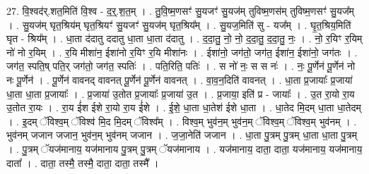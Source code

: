 \documentclass[17pt]{extarticle}
\begin{document}
27. वि॒श्वद॑र्.शत॒मिति॑ वि॒श्व - द॒र्॒.श॒त॒म् । . तु॒वि॒ष्म॒णसꣳ॑ सु॒यजꣳ॑ सु॒यज॑म् तुविष्म॒णस॑म् तुविष्म॒णसꣳ॑ सु॒यज᳚म् । . सु॒यज॑म् घृत॒श्रिय॑म् घृत॒श्रियꣳ॑ सु॒यजꣳ॑ सु॒यज॑म् घृत॒श्रिय᳚म् । . सु॒यज॒मिति॑ सु - यज᳚म् । . घृ॒त॒श्रिय॒मिति॑ घृत - श्रिय᳚म् । . धा॒ता द॑दातु ददातु धा॒ता धा॒ता द॑दातु । . द॒दा॒तु॒ नो॒ नो॒ द॒दा॒तु॒ द॒दा॒तु॒ नः॒ । . नो॒ र॒यिꣳ र॒यिम् नो॑ नो र॒यिम् । . र॒यि मीशा॑न॒ ईशा॑नो र॒यिꣳ र॒यि मीशा॑नः । . ईशा॑नो॒ जग॑तो॒ जग॑त॒ ईशा॑न॒ ईशा॑नो॒ जग॑तः । . जग॑त॒ स्पति॒ष् पति॒र् जग॑तो॒ जग॑त॒ स्पतिः॑ । . पति॒रिति॒ पतिः॑ । . स नो॑ नः॒ स स नः॑ । . नः॒ पू॒र्णेन॑ पू॒र्णेन॑ नो नः पू॒र्णेन॑ । . पू॒र्णेन॑ वावनद् वावनत् पू॒र्णेन॑ पू॒र्णेन॑ वावनत् । . वा॒व॒न॒दिति॑ वावनत् । . धा॒ता प्र॒जायाः᳚ प्र॒जाया॑ धा॒ता धा॒ता प्र॒जायाः᳚ । . प्र॒जाया॑ उ॒तोत प्र॒जायाः᳚ प्र॒जाया॑ उ॒त । . प्र॒जाया॒ इति॑ प्र - जायाः᳚ । . उ॒त रा॒यो रा॒य उ॒तोत रा॒यः । . रा॒य ई॑श ईशे रा॒यो रा॒य ई॑शे । . ई॒शे॒ धा॒ता धा॒तेश॑ ईशे धा॒ता । . धा॒तेद मि॒दम् धा॒ता धा॒तेदम् । . इ॒दम् ॅविश्व॒म् ॅविश्व॑ मि॒द मि॒दम् ॅविश्व᳚म् । . विश्व॒म् भुव॑न॒म् भुव॑न॒म् ॅविश्व॒म् ॅविश्व॒म् भुव॑नम् । . भुव॑नम् जजान जजान॒ भुव॑न॒म् भुव॑नम् जजान । . ज॒जा॒नेति॑ जजान । . धा॒ता पु॒त्रम् पु॒त्रम् धा॒ता धा॒ता पु॒त्रम् । . पु॒त्रम् ॅयज॑मानाय॒ यज॑मानाय पु॒त्रम् पु॒त्रम् ॅयज॑मानाय । . यज॑मानाय॒ दाता॒ दाता॒ यज॑मानाय॒ यज॑मानाय॒ दाता᳚ । . दाता॒ तस्मै॒ तस्मै॒ दाता॒ दाता॒ तस्मै᳚ । \newline
\end{document}
